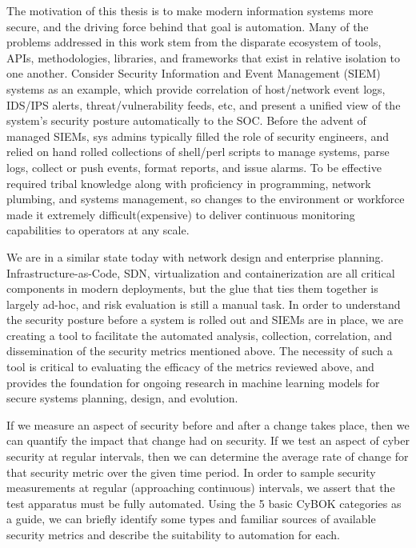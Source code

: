 
The motivation of this thesis is to make modern information systems more secure, and the driving force behind that goal is automation. Many of the problems addressed in this work stem from the disparate ecosystem of tools, APIs, methodologies, libraries, and frameworks that exist in relative isolation to one another. Consider Security Information and Event Management (SIEM) systems as an example, which provide correlation of host/network event logs, IDS/IPS alerts, threat/vulnerability feeds, etc, and present a unified view of the system’s security posture automatically to the SOC. Before the advent of managed SIEMs, sys admins typically filled the role of security engineers, and relied on hand rolled collections of shell/perl scripts to manage systems, parse logs, collect or push events, format reports, and issue alarms. To be effective required tribal knowledge along with proficiency in programming, network plumbing, and systems management, so changes to the environment or workforce made it extremely difficult(expensive) to deliver continuous monitoring capabilities to operators at any scale. 

We are in a similar state today with network design and enterprise planning. Infrastructure-as-Code, SDN, virtualization and containerization are all critical components in modern deployments, but the glue that ties them together is largely ad-hoc, and risk evaluation is still a manual task. In order to understand the security posture before a system is rolled out and SIEMs are in place, we are creating a tool to facilitate the automated analysis, collection, correlation, and dissemination of the security metrics mentioned above. The necessity of such a tool is critical to evaluating the efficacy of the metrics reviewed above, and provides the foundation for ongoing research in machine learning models for secure systems planning, design, and evolution.


If we measure an aspect of security before and after a change takes place, then we can quantify the impact that change had on security. If we test an aspect of cyber security at regular intervals, then we can determine the average rate of change for that security metric over the given time period. In order to sample security measurements at regular (approaching continuous) intervals, we assert that the test apparatus must be fully automated. Using the 5 basic CyBOK categories as a guide, we can briefly identify some types and familiar sources of available security metrics and describe the suitability to automation for each.

